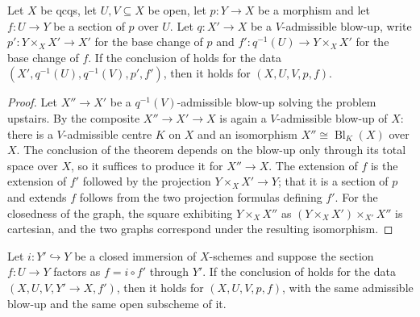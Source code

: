 \begin{lemma}
  \label{lemma:nagata-conrad-blowup-base-change-reduction}
  \leanok

  Let $X$ be qcqs, let $U,V\subseteq X$ be open, let $p\colon Y\to X$ be a
  morphism and let $f\colon U\to Y$ be a section of $p$ over $U$.  Let
  $q\colon X'\to X$ be a $V$-admissible blow-up, write $p'\colon Y\times_XX'\to
  X'$ for the base change of $p$ and $f'\colon q^{-1}(U)\to Y\times_XX'$ for the
  base change of $f$.  If the conclusion of
   holds for the data
  $(X',q^{-1}(U),q^{-1}(V),p',f')$, then it holds for $(X,U,V,p,f)$.
\end{lemma}

\begin{proof}
  \leanok
  Let $X''\to X'$ be a $q^{-1}(V)$-admissible blow-up solving the problem
  upstairs.  By  the composite
  $X''\to X'\to X$ is again a $V$-admissible blow-up of $X$: there is a
  $V$-admissible centre $K$ on $X$ and an isomorphism
  $X''\cong\operatorname{Bl}_K(X)$ over $X$.  The conclusion of the theorem
  depends on the blow-up only through its total space over $X$, so it suffices
  to produce it for $X''\to X$.  The extension of $f$ is the extension of $f'$
  followed by the projection $Y\times_XX'\to Y$; that it is a section of $p$ and
  extends $f$ follows from the two projection formulas defining $f'$.  For the
  closedness of the graph, the square exhibiting $Y\times_XX''$ as
  $(Y\times_XX')\times_{X'}X''$ is cartesian, and the two graphs correspond
  under the resulting isomorphism.
\end{proof}

\begin{lemma}
  \label{lemma:nagata-conrad-closed-target-reduction}
  \leanok

  Let $i\colon Y'\hookrightarrow Y$ be a closed immersion of $X$-schemes and
  suppose the section $f\colon U\to Y$ factors as $f=i\circ f'$ through $Y'$.
  If the conclusion of  holds for the data
  $(X,U,V,Y'\to X,f')$, then it holds for $(X,U,V,p,f)$, with the same
  admissible blow-up and the same open subscheme of it.
\end{lemma}

